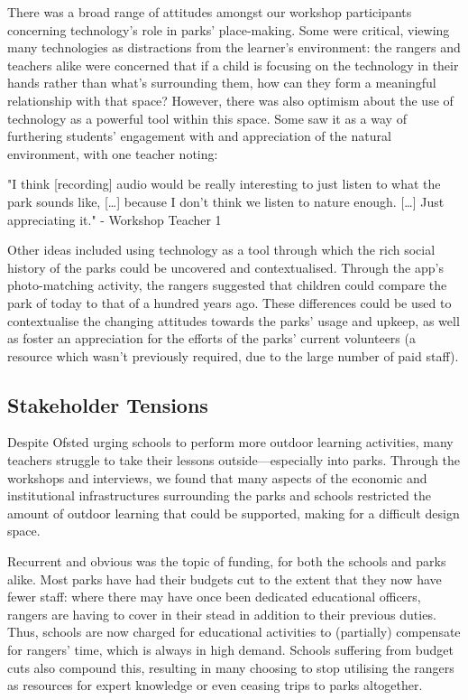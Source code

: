 There was a broad range of attitudes amongst our workshop participants concerning technology’s role in parks’ place-making. Some were critical, viewing many technologies as distractions from the learner’s environment: the rangers and teachers alike were concerned that if a child is focusing on the technology in their hands rather than what’s surrounding them, how can they form a meaningful relationship with that space? However, there was also optimism about the use of technology as a powerful tool within this space. Some saw it as a way of furthering students’ engagement with and appreciation of the natural environment, with one teacher noting:

\begin{displayquote}
"I think [recording] audio would be really interesting to just listen to what the park sounds like, […] because I don't think we listen to nature enough. […] Just appreciating it." - Workshop Teacher 1
\end{displayquote}

Other ideas included using technology as a tool through which the rich social history of the parks could be uncovered and contextualised. Through the app’s photo-matching activity, the rangers suggested that children could compare the park of today to that of a hundred years ago. These differences could be used to contextualise the changing attitudes towards the parks’ usage and upkeep, as well as foster an appreciation for the efforts of the parks’ current volunteers (a resource which wasn't previously required, due to the large number of paid staff).

\subsection{Stakeholder Tensions}

Despite Ofsted urging schools to perform more outdoor learning activities, many teachers struggle to take their lessons outside---especially into parks. Through the workshops and interviews, we found that many aspects of the economic and institutional infrastructures surrounding the parks and schools restricted the amount of outdoor learning that could be supported, making for a difficult design space.

Recurrent and obvious was the topic of funding, for both the schools and parks alike. Most parks have had their budgets cut to the extent that they now have fewer staff: where there may have once been dedicated educational officers, rangers are having to cover in their stead in addition to their previous duties. Thus, schools are now charged for educational activities to (partially) compensate for rangers’ time, which is always in high demand. Schools suffering from budget cuts also compound this, resulting in many choosing to stop utilising the rangers as resources for expert knowledge or even ceasing trips to parks altogether.

